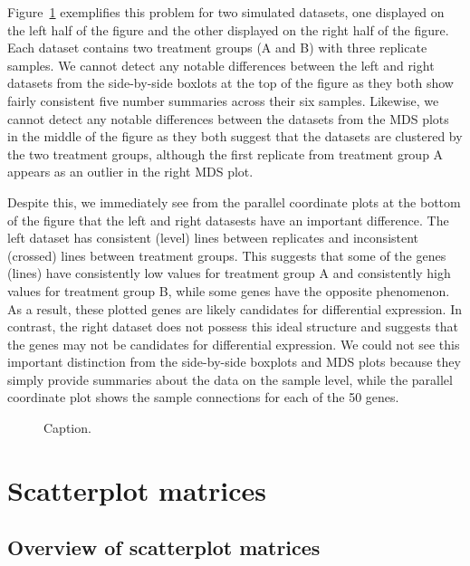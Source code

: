 \documentclass[useAMS,referee]{biom}
\begin{document}
Figure~\ref{2group} exemplifies this problem for two simulated datasets, one displayed on the left half of the figure and the other displayed on the right half of the figure. Each dataset contains two treatment groups (A and B) with three replicate samples. We cannot detect any notable differences between the left and right datasets from the side-by-side boxlots at the top of the figure as they both show fairly consistent five number summaries across their six samples. Likewise, we cannot detect any notable differences between the datasets from the MDS plots in the middle of the figure as they both suggest that the datasets are clustered by the two treatment groups, although the first replicate from treatment group A appears as an outlier in the right MDS plot.

Despite this, we immediately see from the parallel coordinate plots at the bottom of the figure that the left and right datasests have an important difference. The left dataset has consistent (level) lines between replicates and inconsistent (crossed) lines between treatment groups. This suggests that some of the genes (lines) have consistently low values for treatment group A and consistently high values for treatment group B, while some genes have the opposite phenomenon. As a result, these plotted genes are likely candidates for differential expression. In contrast, the right dataset does not possess this ideal structure and suggests that the genes may not be candidates for differential expression. We could not see this important distinction from the side-by-side boxplots and MDS plots because they simply provide summaries about the data on the sample level, while the parallel coordinate plot shows the sample connections for each of the 50 genes.

\begin{figure}
\begin{center}
\centerline{}
\end{center}
\caption{Caption.
\label{2group}}
\end{figure}

\section{Scatterplot matrices}
\label{s:Scatterplot matrices}

\subsection{Overview of scatterplot matrices}
\label{s:Overview of scatterplot matrices}
\end{document}

